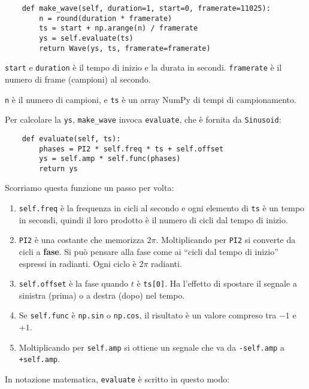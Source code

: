 \documentclass[12pt,a4paper]{book}
\begin{document}
\begin{verbatim} 
    def make_wave(self, duration=1, start=0, framerate=11025):
        n = round(duration * framerate)
        ts = start + np.arange(n) / framerate
        ys = self.evaluate(ts)
        return Wave(ys, ts, framerate=framerate)
 \end{verbatim} 

{\tt start} e {\tt duration} è il tempo di inizio e la durata in secondi. {\tt framerate} è il numero di frame (campioni) al secondo.

{\tt n} è il numero di campioni, e {\tt ts} è un array NumPy di tempi di campionamento.

Per calcolare la {\tt ys}, \verb"make_wave" invoca {\tt evaluate}, che è fornita da {\tt Sinusoid}:

\begin{verbatim} 
    def evaluate(self, ts):
        phases = PI2 * self.freq * ts + self.offset
        ys = self.amp * self.func(phases)
        return ys
 \end{verbatim} 

Scorriamo questa funzione un passo per volta:

\begin{enumerate} 

\item {\tt self.freq} è la frequenza in cicli al secondo e ogni elemento di {\tt ts} è un tempo in secondi, quindi il loro prodotto è il numero di cicli dal tempo di inizio.

\item {\tt PI2} è una costante che memorizza $2 \pi$. Moltiplicando per {\tt PI2} si converte da cicli a {\bf fase}. Si può pensare alla fase come ai ``cicli dal tempo di inizio'' espressi in radianti. Ogni ciclo è $2 \pi$ radianti.

\item {\tt self.offset} è la fase quando $t$ è {\tt ts[0]}. Ha l'effetto di spostare il segnale a sinistra (prima) o a destra (dopo) nel tempo.

\item Se {\tt self.func} è {\tt np.sin} o {\tt np.cos}, il risultato è un valore compreso tra $-1$ e $+1$.

\item Moltiplicando per {\tt self.amp} si ottiene un segnale che va da {\tt -self.amp} a {\tt +self.amp}.

\end{enumerate} 

In notazione matematica, {\tt evaluate} è scritto in questo modo:
\end{document}
